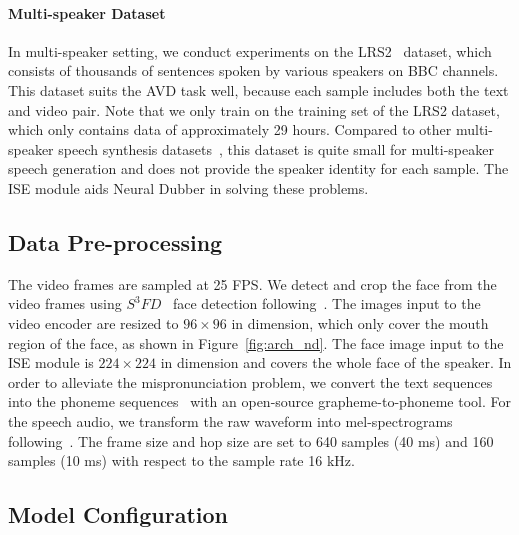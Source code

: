\documentclass{article}
\begin{document}
\paragraph{Multi-speaker Dataset}
In multi-speaker setting, we conduct experiments on the LRS2~\cite{afouras2018deepav}  dataset, which consists of thousands of sentences spoken by various speakers on BBC channels. This dataset suits the AVD task well, because each sample includes both the text and video pair. Note that we only train on the training set of the LRS2 dataset, which only contains data of approximately 29 hours. Compared to other multi-speaker speech synthesis datasets~\cite{zen2019libritts}, this dataset is quite small for multi-speaker speech generation and does not provide the speaker identity for each sample. The ISE module aids Neural Dubber in solving these problems.


\subsection{Data Pre-processing}
The video frames are sampled at 25 FPS. We detect and crop the face from the video frames using $S^3FD$~\cite{zhang2017s3fd} face detection following~\cite{prajwal2020learning}. The images input to the video encoder are resized to  $96 \times 96$ in dimension, which only cover the mouth region of the face, as shown in Figure~\ref{fig:arch_nd}. The face image input to the ISE module is $224 \times 224$ in dimension and covers the whole face of the speaker.
In order to alleviate the mispronunciation problem, we convert the text sequences into the phoneme sequences~\cite{arik2017deep,li2019neural,ren2021fastspeech} with an open-source grapheme-to-phoneme tool.
For the speech audio, we transform the raw waveform into mel-spectrograms following~\cite{shen2018natural}. The frame size and hop size are set to 640 samples (40 ms) and 160 samples (10 ms) with respect to the sample rate 16 kHz. 



\subsection{Model Configuration}
\end{document}
